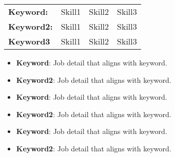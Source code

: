 \documentclass[10pt,letterpaper,ragged2e,withhyper]{altacv}
\begin{document}
\makecvheader

  \begin{tabularx}{0.675\textwidth}{llll}
    \textbf{Keyword:} & Skill1 & Skill2 & Skill3 \\ 
    \textbf{Keyword2:} & Skill1 & Skill2 & Skill3 \\ 
    \textbf{Keyword3} & Skill1 & Skill2 & Skill3 \\ 
  \end{tabularx}


  \begin{itemize}
    \item{\textbf{Keyword}: Job detail that aligns with keyword.}
    \item{\textbf{Keyword2}: Job detail that aligns with keyword.}
  \end{itemize}

  \divider

  \begin{itemize}
    \item{\textbf{Keyword}: Job detail that aligns with keyword.}
    \item{\textbf{Keyword2}: Job detail that aligns with keyword.}
  \end{itemize}

  \divider

  \begin{itemize}
    \item{\textbf{Keyword}: Job detail that aligns with keyword.}
    \item{\textbf{Keyword2}: Job detail that aligns with keyword.}
  \end{itemize}
  
\end{document}
